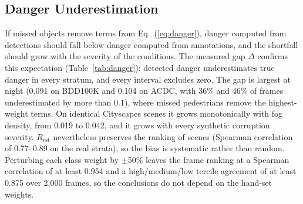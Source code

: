 \documentclass[pdflatex,sn-mathphys-num]{sn-jnl}
\newcommand{\Rest}{R_{\mathrm{est}}}
\begin{document}
\subsection{Danger Underestimation}\label{sec:res_danger}

If missed objects remove terms from Eq.~(\ref{eq:danger}), danger computed from detections should fall below danger computed from annotations, and the shortfall should grow with the severity of the conditions. The measured gap $\Delta$ confirms this expectation (Table~\ref{tab:danger}): detected danger underestimates true danger in every stratum, and every interval excludes zero. The gap is largest at night (0.091 on BDD100K and 0.104 on ACDC, with 36\% and 46\% of frames underestimated by more than 0.1), where missed pedestrians remove the highest-weight terms. On identical Cityscapes scenes it grows monotonically with fog density, from 0.019 to 0.042, and it grows with every synthetic corruption severity. $\Rest$ nevertheless preserves the ranking of scenes (Spearman correlation of 0.77--0.89 on the real strata), so the bias is systematic rather than random. Perturbing each class weight by $\pm$50\% leaves the frame ranking at a Spearman correlation of at least 0.954 and a high/medium/low tercile agreement of at least 0.875 over 2,000 frames, so the conclusions do not depend on the hand-set weights.
\end{document}
